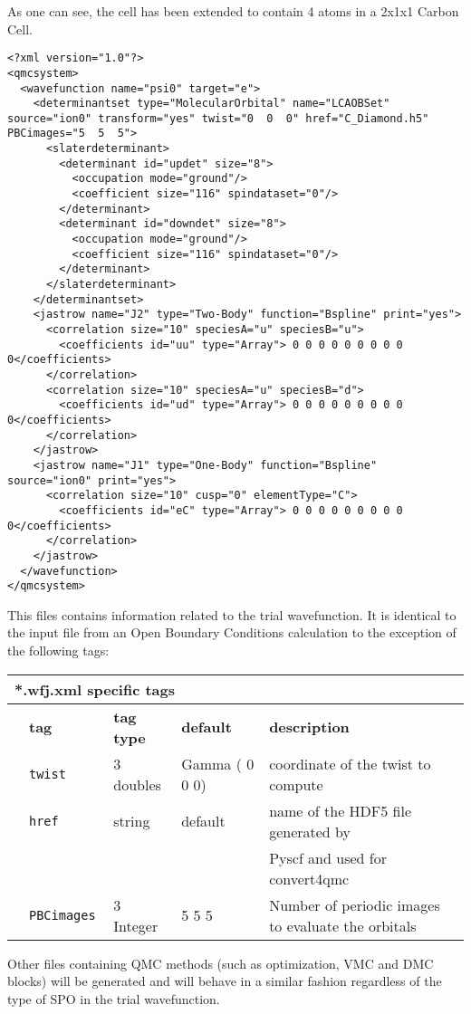 \begin{itemize}
  As one can see, the cell has been extended to contain 4 atoms in a 2x1x1 Carbon Cell.
\begin{lstlisting}[caption=CDiamond.wfj-Twist0.xml. This file contains the trial wavefunction.]
<?xml version="1.0"?>
<qmcsystem>
  <wavefunction name="psi0" target="e">
    <determinantset type="MolecularOrbital" name="LCAOBSet" source="ion0" transform="yes" twist="0  0  0" href="C_Diamond.h5" PBCimages="5  5  5">
      <slaterdeterminant>
        <determinant id="updet" size="8">
          <occupation mode="ground"/>
          <coefficient size="116" spindataset="0"/>
        </determinant>
        <determinant id="downdet" size="8">
          <occupation mode="ground"/>
          <coefficient size="116" spindataset="0"/>
        </determinant>
      </slaterdeterminant>
    </determinantset>
    <jastrow name="J2" type="Two-Body" function="Bspline" print="yes">
      <correlation size="10" speciesA="u" speciesB="u">
        <coefficients id="uu" type="Array"> 0 0 0 0 0 0 0 0 0 0</coefficients>
      </correlation>
      <correlation size="10" speciesA="u" speciesB="d">
        <coefficients id="ud" type="Array"> 0 0 0 0 0 0 0 0 0 0</coefficients>
      </correlation>
    </jastrow>
    <jastrow name="J1" type="One-Body" function="Bspline" source="ion0" print="yes">
      <correlation size="10" cusp="0" elementType="C">
        <coefficients id="eC" type="Array"> 0 0 0 0 0 0 0 0 0 0</coefficients>
      </correlation>
    </jastrow>
  </wavefunction>
</qmcsystem>
 \end{lstlisting}
This files contains information related to the trial wavefunction. It is identical to the input file from an Open Boundary Conditions calculation to the exception of the following tags:\\
\begin{table}[h]
\begin{center}
\begin{tabularx}{\textwidth}{l l l l l }
\hline
\multicolumn{5}{l}{*.wfj.xml specific tags} \\
\hline
   &   \bfseries tag     & \bfseries tag type & \bfseries default   & \bfseries description \\
   &   \texttt{twist             } &  3 doubles  & Gamma ( 0 0 0)& coordinate of the twist to compute\\
   &   \texttt{href             } &  string  & default& name of the HDF5 file generated by\\ 
   &                              &          &        &  Pyscf and used for convert4qmc\\  
   &   \texttt{PBCimages            } &  3 Integer   & 5 5 5  & Number of periodic images to evaluate the orbitals\\
    \hline
    \end{tabularx}
\end{center}
\end{table}

Other files containing QMC methods (such as optimization, VMC and DMC blocks) will be generated and will behave in a similar fashion regardless of the type of SPO in the trial wavefunction. 



\end{itemize}


 

